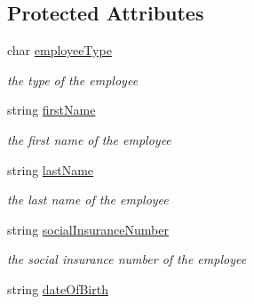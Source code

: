 \subsection*{Protected Attributes}
\begin{DoxyCompactItemize}
\item 
\hypertarget{class_all_employees_1_1_employee_ae5727b7309a3e64307aa997e459a6504}{char \hyperlink{class_all_employees_1_1_employee_ae5727b7309a3e64307aa997e459a6504}{employee\-Type}}\label{class_all_employees_1_1_employee_ae5727b7309a3e64307aa997e459a6504}

\begin{DoxyCompactList}\small\item\em the type of the employee \end{DoxyCompactList}\item 
\hypertarget{class_all_employees_1_1_employee_a04c4c16015aa2d889fd2042ce4b8a1d7}{string \hyperlink{class_all_employees_1_1_employee_a04c4c16015aa2d889fd2042ce4b8a1d7}{first\-Name}}\label{class_all_employees_1_1_employee_a04c4c16015aa2d889fd2042ce4b8a1d7}

\begin{DoxyCompactList}\small\item\em the first name of the employee \end{DoxyCompactList}\item 
\hypertarget{class_all_employees_1_1_employee_ac3721b61919ca9cd29a400620562170e}{string \hyperlink{class_all_employees_1_1_employee_ac3721b61919ca9cd29a400620562170e}{last\-Name}}\label{class_all_employees_1_1_employee_ac3721b61919ca9cd29a400620562170e}

\begin{DoxyCompactList}\small\item\em the last name of the employee \end{DoxyCompactList}\item 
\hypertarget{class_all_employees_1_1_employee_af589b347b218838839d5d736e3f83ef9}{string \hyperlink{class_all_employees_1_1_employee_af589b347b218838839d5d736e3f83ef9}{social\-Insurance\-Number}}\label{class_all_employees_1_1_employee_af589b347b218838839d5d736e3f83ef9}

\begin{DoxyCompactList}\small\item\em the social insurance number of the employee \end{DoxyCompactList}\item 
\hypertarget{class_all_employees_1_1_employee_a258bcc8fcc3ce596ee05f796c2190f59}{string \hyperlink{class_all_employees_1_1_employee_a258bcc8fcc3ce596ee05f796c2190f59}{date\-Of\-Birth}}\label{class_all_employees_1_1_employee_a258bcc8fcc3ce596ee05f796c2190f59}


\end{DoxyCompactItemize}
